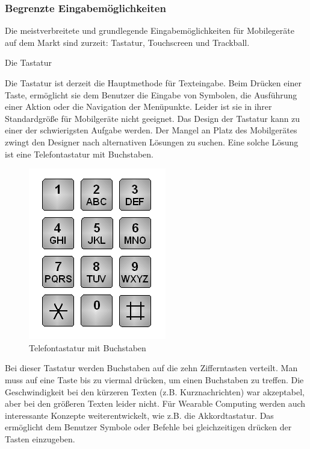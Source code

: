 
\subsubsection{Begrenzte Eingabemöglichkeiten} %
\label{ssub:einschr_nkungen_in_mentalen_bereich}
Die meistverbreitete und grundlegende Eingabemöglichkeiten für Mobilegeräte auf dem Markt sind zurzeit: Tastatur, Touchscreen und Trackball.

Die Tastatur

Die Tastatur ist derzeit die Hauptmethode für Texteingabe.  Beim Drücken einer Taste, ermöglicht sie dem Benutzer die Eingabe von Symbolen, die Ausführung einer Aktion oder die Navigation der Menüpunkte. Leider ist sie in ihrer Standardgröße für Mobilgeräte nicht geeignet. Das Design der Tastatur kann zu einer der schwierigsten Aufgabe werden. Der Mangel an Platz des Mobilgerätes zwingt den Designer nach alternativen Lösungen zu suchen. Eine solche Lösung ist eine Telefontastatur mit Buchstaben. 

 \begin{figure}[h]
 \centering
 \includegraphics[height=0.25\textheight]{img/Tastatur_ITU-T-E161_4x3.png}
 \caption{Telefontastatur mit Buchstaben}
\end{figure}

Bei dieser Tastatur werden Buchstaben auf die zehn Zifferntasten verteilt. Man muss auf eine Taste bis zu viermal drücken, um einen Buchstaben zu treffen. Die Geschwindigkeit bei den kürzeren Texten (z.B. Kurznachrichten) war akzeptabel, aber bei den größeren Texten leider nicht.  Für Wearable Computing werden auch interessante Konzepte weiterentwickelt, wie z.B. die Akkordtastatur. Das ermöglicht dem Benutzer Symbole oder Befehle bei gleichzeitigen drücken der Tasten einzugeben. 

